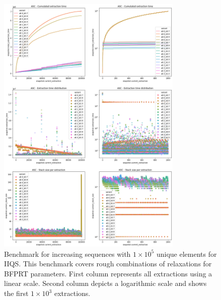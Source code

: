 \begin{figure}[p]
    \centering
    \includegraphics[width=0.79\textwidth]{./fragments/04_experimental_execution/images/04_alphabeta_detail_increasing.png}
    \caption{Benchmark for increasing sequences with $1\times10^5$ unique elements for IIQS. This benchmark covers rough combinations of relaxations for BFPRT parameters. First column represents all extractions using a linear scale. Second column depicts a logarithmic scale and shows the first $1\times10^3$ extractions. }
    \label{FIG:05_ALPHABETA_BENCHMARK_ASC}
\end{figure}

